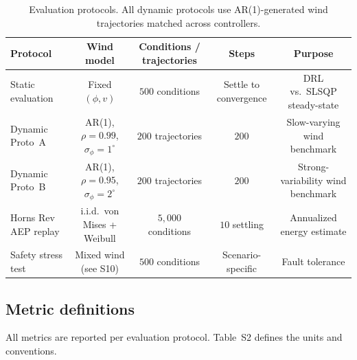 \documentclass{article}
\begin{document}
\begin{table}[h]
\centering
\caption{Evaluation protocols. All dynamic protocols use AR(1)-generated wind trajectories matched across controllers.}
\label{tab:protocols}
\small
\begin{tabular}{lcccc}
\toprule
Protocol & Wind model & Conditions / trajectories & Steps & Purpose \\
\midrule
Static evaluation & Fixed $(\phi,v)$ & $500$ conditions & Settle to convergence & DRL vs.\ SLSQP steady-state \\
Dynamic Proto~A & AR(1), $\rho{=}0.99$, $\sigma_\phi{=}1^\circ$ & $200$ trajectories & $200$ & Slow-varying wind benchmark \\
Dynamic Proto~B & AR(1), $\rho{=}0.95$, $\sigma_\phi{=}2^\circ$ & $200$ trajectories & $200$ & Strong-variability wind benchmark \\
Horns Rev AEP replay & i.i.d.\ von Mises + Weibull & $5{,}000$ conditions & $10$ settling & Annualized energy estimate \\
Safety stress test & Mixed wind (see S10) & $500$ conditions & Scenario-specific & Fault tolerance \\
\bottomrule
\end{tabular}
\end{table}

\subsection{Metric definitions}

All metrics are reported per evaluation protocol. Table~S2 defines the units and conventions.
\end{document}

